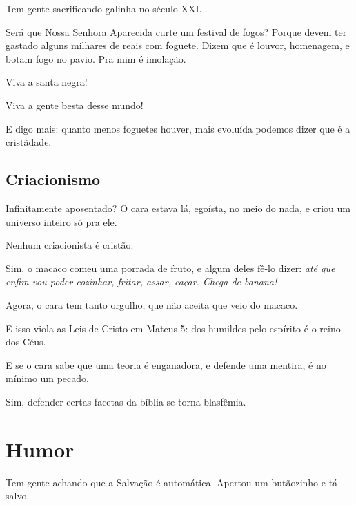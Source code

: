 \documentclass[12pt,a4paper]{article}
\begin{document}
			Tem gente sacrificando galinha no s\'eculo XXI.

		\begin{flushright}
		\end{flushright}

Ser\'a que Nossa Senhora Aparecida curte um festival de fogos? Porque devem ter gastado alguns milhares de reais com foguete.
Dizem que \'e louvor, homenagem, e botam fogo no pavio.
Pra mim \'e imola\c{c}\~ao.

Viva a santa negra!

Viva a gente besta desse mundo!

E digo mais: quanto menos foguetes houver, mais evolu\'ida podemos dizer que \'e a crist\~adade.

		\subsection {Criacionismo}

			\begin{flushright}
			\end{flushright}

Infinitamente aposentado? O cara estava l\'a, ego\'ista, no meio do nada, e criou um universo inteiro s\'o pra ele.

Nenhum criacionista \'e crist\~ao.

Sim, o macaco comeu uma porrada de fruto, e algum deles f\^e-lo dizer: \emph{at\'e que enfim vou poder cozinhar, fritar, assar, ca\c{c}ar. Chega de banana!}

Agora, o cara tem tanto orgulho, que n\~ao aceita que veio do macaco.

E isso viola as Leis de Cristo em Mateus 5: dos humildes pelo esp\'irito \'e o reino dos C\'eus.

E se o cara sabe que uma teoria \'e enganadora, e defende uma mentira, \'e no m\'inimo um pecado.

Sim, defender certas facetas da b\'iblia se torna blasf\^emia.

	\section{Humor}
		\begin{flushright}
		\end{flushright}

		Tem gente achando que a Salva\c{c}\~ao\cite{x} \'e autom\'atica. Apertou um but\~aozinho e t\'a salvo.

		\begin{flushright}
		\end{flushright}
\end{document}

